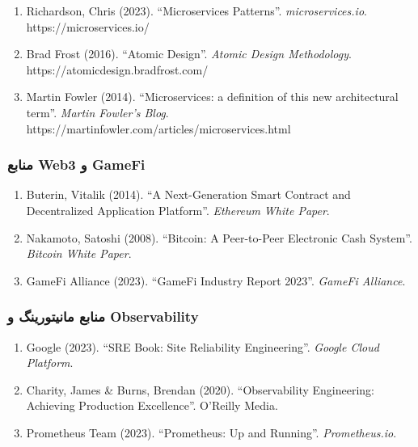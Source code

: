 \documentclass[
]{article}
\begin{document}
\begin{enumerate}
\def\labelenumi{\arabic{enumi}.}
\setcounter{enumi}{18}
\item
  Richardson, Chris (2023). ``Microservices Patterns''.
  \emph{microservices.io}. https://microservices.io/
\item
  Brad Frost (2016). ``Atomic Design''. \emph{Atomic Design
  Methodology}. https://atomicdesign.bradfrost.com/
\item
  Martin Fowler (2014). ``Microservices: a definition of this new
  architectural term''. \emph{Martin Fowler's Blog}.
  https://martinfowler.com/articles/microservices.html
\end{enumerate}

\subsubsection{منابع Web3 و
GameFi}\label{ux645ux646ux627ux628ux639-web3-ux648-gamefi}

\begin{enumerate}
\def\labelenumi{\arabic{enumi}.}
\setcounter{enumi}{21}
\item
  Buterin, Vitalik (2014). ``A Next-Generation Smart Contract and
  Decentralized Application Platform''. \emph{Ethereum White Paper}.
\item
  Nakamoto, Satoshi (2008). ``Bitcoin: A Peer-to-Peer Electronic Cash
  System''. \emph{Bitcoin White Paper}.
\item
  GameFi Alliance (2023). ``GameFi Industry Report 2023''. \emph{GameFi
  Alliance}.
\end{enumerate}

\subsubsection{منابع مانیتورینگ و
Observability}\label{ux645ux646ux627ux628ux639-ux645ux627ux646ux6ccux62aux648ux631ux6ccux646ux6af-ux648-observability}

\begin{enumerate}
\def\labelenumi{\arabic{enumi}.}
\setcounter{enumi}{24}
\item
  Google (2023). ``SRE Book: Site Reliability Engineering''.
  \emph{Google Cloud Platform}.
\item
  Charity, James \& Burns, Brendan (2020). ``Observability Engineering:
  Achieving Production Excellence''. O'Reilly Media.
\item
  Prometheus Team (2023). ``Prometheus: Up and Running''.
  \emph{Prometheus.io}.
\end{enumerate}
\end{document}
